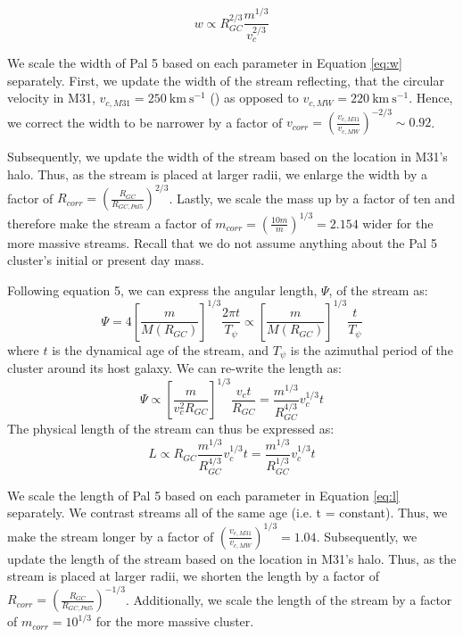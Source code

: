 \documentclass[twocolumn]{aastex62}
\newcommand{\kms}{\ensuremath{\textrm{km}~\textrm{s}^{-1}}}
\newcommand{\todo}[1]{{\color{red} TODO: #1}}
\begin{document}
\begin{equation}
\label{eq:w}
w \propto R_{GC}^{2/3} \frac{m^{1/3}}{v_c^{2/3}}
\end{equation}

We scale the width of Pal 5 based on each parameter in Equation \ref{eq:w} separately. First, we update the width of the stream reflecting, that the circular velocity in M31, $v_{c, M31}= 250 ~\kms$  (\citealt{chemin09}) as opposed to  $v_{c, MW}= 220 ~\kms$. Hence, we correct the width to be narrower by a factor of $v_{corr} =  \left(\frac{v_{c,M31}}{v_{c,MW}}\right)^{-2/3} \sim 0.92$. 

Subsequently, we update the width of the stream based on the location in M31's halo. Thus, as the stream is placed at larger radii, we enlarge the width by a factor of  $R_{corr} = \left(\frac{R_{GC}}{R_{GC,Pal5}}\right)^{2/3}$. Lastly, we scale the mass up by a factor of ten and therefore make the stream a factor of $m_{corr} = \left(\frac{10m}{m}\right)^{1/3}= 2.154$ wider for the more massive streams. Recall that we do not assume anything about the Pal 5 cluster's initial or present day mass. 


Following \citet{johnston01} equation 5, we can express the angular length, $\Psi$, of the stream as:
\begin{equation}
\Psi = 4  \left[\frac{m}{M(R_{GC})}\right]^{1/3}  \frac{2 \pi t}{T_{\psi}} \propto \left[\frac{m}{M(R_{GC})}\right]^{1/3}  \frac{t}{T_{\psi}}
\end{equation}
where $t$ is the dynamical age of the stream, and $T_{\psi}$ is the azimuthal period of the cluster around its host galaxy. We can re-write the length as:
\begin{equation}
\Psi \propto \left[\frac{m }{v_c^2 R_{GC}}\right]^{1/3}  \frac{v_c t }{R_{GC}} = \frac{m^{1/3}}{R_{GC}^{4/3}} v_c^{1/3}t
\end{equation}
The physical length of the stream can thus be expressed as:
\begin{equation}
\label{eq:l}
L \propto R_{GC} \frac{m^{1/3}}{R_{GC}^{4/3}} v_c^{1/3}t = \frac{m^{1/3}}{R_{GC}^{1/3}} v_c^{1/3}t
\end{equation}

We scale  the length of Pal 5 based on each parameter in Equation \ref{eq:l} separately. We contrast streams all of the same age (i.e.  t = constant). Thus, we make the stream longer by a factor of $(\frac{v_{c,M31}}{v_{c,MW}})^{1/3} = 1.04$. Subsequently, we update the length of the stream based on the location in M31's halo. Thus, as the stream is placed at larger radii, we shorten the length by a factor of  $R_{corr} = \left(\frac{R_{GC}}{R_{GC,Pal5}}\right)^{-1/3}$. %
Additionally, we scale the length of the stream by a factor of $m_{corr} = 10^{1/3}$ for the more massive cluster. 
\end{document}
